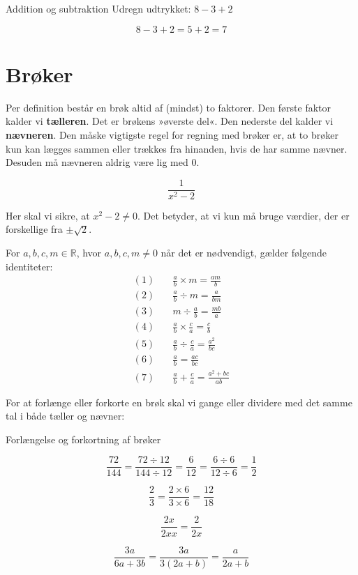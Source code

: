 \begin{example} Addition og subtraktion \newline
Udregn udtrykket: \(8 - 3 + 2\)

\[
8 - 3 + 2 = 5 + 2 = 7
\]
\end{example}

\section{Brøker}
Per definition består en brøk altid af (mindst) to faktorer. Den første faktor kalder vi \textbf{tælleren}. Det er brøkens »øverste del«. Den nederste del kalder vi \textbf{nævneren}. Den måske vigtigste regel for regning med brøker er, at to brøker kun kan lægges sammen eller trækkes fra hinanden, hvis de har samme nævner. Desuden må nævneren aldrig være lig med 0.

\begin{example}

\[
\frac{1}{x^2 - 2}
\]    
\end{example}

Her skal vi sikre, at \(x^2 - 2 \neq 0\). Det betyder, at vi kun må bruge værdier, der er forskellige fra \(\pm\sqrt{2}\).

\begin{proposition}
For $a,b,c,m \in \mathbb{R}$, hvor $a,b,c,m \neq 0$ når det er nødvendigt, gælder følgende identiteter:
\begingroup
\setlength{\jot}{8pt} %
\begin{align*}
(1) & \quad \frac{a}{b} \times m = \frac{am}{b} \\
(2) & \quad \frac{a}{b} \div m = \frac{a}{bm} \\
(3) & \quad m \div \frac{a}{b} = \frac{mb}{a} \\
(4) & \quad \frac{a}{b} \times \frac{c}{a} = \frac{c}{b} \\
(5) & \quad \frac{a}{b} \div \frac{c}{a} = \frac{a^2}{bc} \\
(6) & \quad \frac{a}{b} = \frac{ac}{bc} \\
(7) & \quad \frac{a}{b} + \frac{c}{a} = \frac{a^2 + bc}{ab}
\end{align*}
\endgroup
\end{proposition}

For at forlænge eller forkorte en brøk skal vi gange eller dividere med det samme tal i både tæller og nævner:

\begin{example} Forlængelse og forkortning af brøker

\[
\frac{72}{144} = \frac{72 \div 12}{144 \div 12} = \frac{6}{12} = \frac{6 \div 6}{12 \div 6} = \frac{1}{2}
\]

\[
\frac{2}{3} = \frac{2 \times 6}{3 \times 6} = \frac{12}{18}
\]

\[
\frac{2x}{2xx} = \frac{2}{2x}
\]

\[
\frac{3a}{6a + 3b} = \frac{3a}{3(2a + b)} = \frac{a}{2a + b}
\]    
\end{example}

